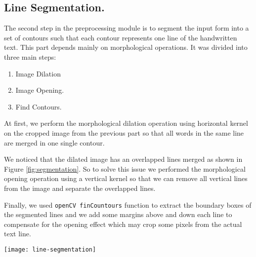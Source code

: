 \subsection{Line Segmentation.}
The second step in the preprocessing module is to segment the input form into a set of contours such that each contour represents one line of the handwritten text. This part depends mainly on morphological operations. It was divided into three main steps: 
\begin{enumerate}
  \item Image Dilation
  \item Image Opening.
  \item Find Contours.
\end{enumerate}

At first, we perform the morphological dilation operation using horizontal kernel on the cropped image from the previous part so that all words in the same line are merged in one single contour. 

We noticed that the dilated image has an overlapped lines merged as shown in Figure \ref{fig:segmentation}. So to solve this issue we performed the morphological opening operation using a vertical kernel so that we can remove all vertical lines from the image and separate the overlapped lines. 

Finally, we used  \texttt{openCV finCountours} function to extract the boundary boxes of the segmented lines and we add some margins above and down each line to compensate for the opening effect which may crop some pixels from the actual text line. 

\begin{figure*}[h]
    \centering
    \texttt{[image: line-segmentation]}
    \label{fig:segmentation}
\end{figure*}